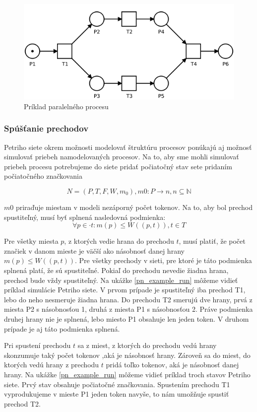 \begin{figure}[!htbp]
\centering
\includegraphics[width=12cm]{img/basic_net.png}
\caption{Príklad paralelného procesu}
\label{basic_net}
\end{figure}


\subsubsection{Spúšťanie prechodov}
Petriho siete okrem možnosti modelovať štruktúru procesov ponúkajú aj možnosť simulovať priebeh namodelovaných procesov.
Na to, aby sme mohli simulovať priebeh procesu potrebujeme do siete pridať počiatočný stav sete pridaním počiatočného značkovania  

\[N = (P, T, F, W, m_0 ), m0: P \rightarrow n, n \subseteq \mathbb N\]

$m0$ priraďuje miestam v modeli nezáporný počet tokenov. Na to, aby bol prechod spustiteľný, musí byť splnená nasledovná podmienka:
\[ \forall p \in \cdot t: m(p) \leq W((p,t)), t \in T\]

Pre všetky miesta $p$, z ktorých vedie hrana do prechodu $t$, musí platiť, že počet značiek v danom mieste je väčší ako násobnosť danej hrany $ m(p) \leq W((p,t)) $. Pre všetky prechody v sieti, pre ktoré je táto podmienka splnená platí, že sú spustiteľné. Pokiaľ do prechodu nevedie žiadna hrana, prechod bude vždy spustiteľný.
Na ukážke \ref {pn_example_run} môžeme vidieť príklad simulácie Petriho siete. V prvom prípade je spustiteľný iba prechod T1, lebo do neho nesmeruje žiadna hrana. Do prechodu T2 smerujú dve hrany, prvá z miesta P2 s násobnosťou 1, druhá z miesta P1 s násobnosťou 2. Práve podmienka druhej hrany nie je splnená, lebo miesto P1 obsahuje len jeden token. V druhom prípade je aj táto podmienka splnená.
 
Pri spustení prechodu $t$ sa z miest, z ktorých do prechodu vedú hrany skonzumuje taký počet tokenov ,aká je násobnosť hrany. Zároveň sa do miest, do ktorých vedú hrany z prechodu $t$ pridá toľko tokenov, aká je násobnosť danej hrany. Na ukážke \ref{pn_example_run} môžeme vidieť príklad troch stavov Petriho siete. Prvý stav obsahuje počiatočné značkovania. 
Spustením prechodu T1 vyprodukujeme v mieste P1 jeden token navyše, to nám umožňuje spustiť prechod T2. 


